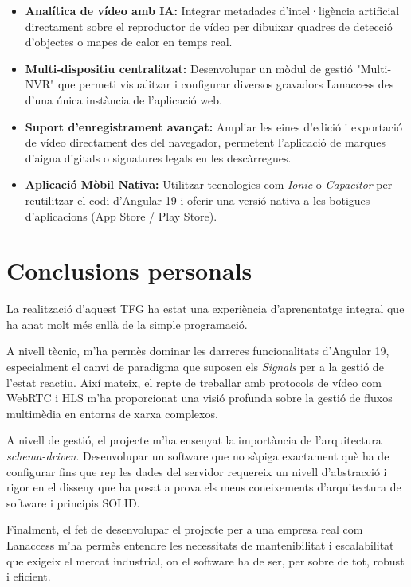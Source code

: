 \begin{itemize}
    \item \textbf{Analítica de vídeo amb IA:} Integrar metadades d'intel·ligència artificial directament sobre el reproductor de vídeo per dibuixar quadres de detecció d'objectes o mapes de calor en temps real.
    \item \textbf{Multi-dispositiu centralitzat:} Desenvolupar un mòdul de gestió "Multi-NVR" que permeti visualitzar i configurar diversos gravadors Lanaccess des d'una única instància de l'aplicació web.
    \item \textbf{Suport d'enregistrament avançat:} Ampliar les eines d'edició i exportació de vídeo directament des del navegador, permetent l'aplicació de marques d'aigua digitals o signatures legals en les descàrregues.
    \item \textbf{Aplicació Mòbil Nativa:} Utilitzar tecnologies com \textit{Ionic} o \textit{Capacitor} per reutilitzar el codi d'Angular 19 i oferir una versió nativa a les botigues d'aplicacions (App Store / Play Store).
\end{itemize}

\section{Conclusions personals}
La realització d'aquest TFG ha estat una experiència d'aprenentatge integral que ha anat molt més enllà de la simple programació. 

A nivell tècnic, m'ha permès dominar les darreres funcionalitats d'Angular 19, especialment el canvi de paradigma que suposen els \textit{Signals} per a la gestió de l'estat reactiu. Així mateix, el repte de treballar amb protocols de vídeo com WebRTC i HLS m'ha proporcionat una visió profunda sobre la gestió de fluxos multimèdia en entorns de xarxa complexos.

A nivell de gestió, el projecte m'ha ensenyat la importància de l'arquitectura \textit{schema-driven}. Desenvolupar un software que no sàpiga exactament què ha de configurar fins que rep les dades del servidor requereix un nivell d'abstracció i rigor en el disseny que ha posat a prova els meus coneixements d'arquitectura de software i principis SOLID.

Finalment, el fet de desenvolupar el projecte per a una empresa real com Lanaccess m'ha permès entendre les necessitats de mantenibilitat i escalabilitat que exigeix el mercat industrial, on el software ha de ser, per sobre de tot, robust i eficient.